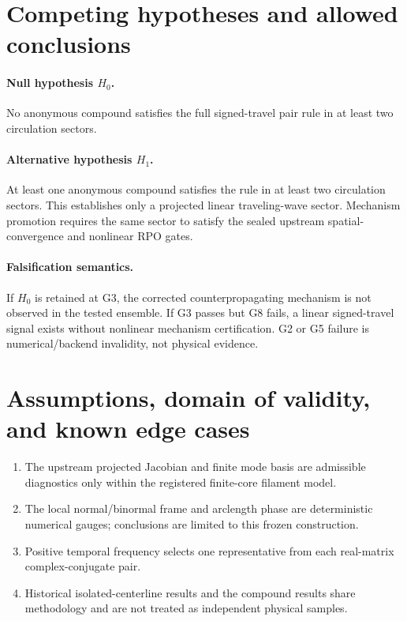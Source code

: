 \documentclass[11pt,a4paper]{article}
\begin{document}
\section{Competing hypotheses and allowed conclusions}
\paragraph{Null hypothesis $H_0$.}
No anonymous compound satisfies the full signed-travel pair rule in at least two circulation sectors.

\paragraph{Alternative hypothesis $H_1$.}
At least one anonymous compound satisfies the rule in at least two circulation sectors. This establishes only a projected linear traveling-wave sector. Mechanism promotion requires the same sector to satisfy the sealed upstream spatial-convergence and nonlinear RPO gates.

\paragraph{Falsification semantics.}
If $H_0$ is retained at G3, the corrected counterpropagating mechanism is not observed in the tested ensemble. If G3 passes but G8 fails, a linear signed-travel signal exists without nonlinear mechanism certification. G2 or G5 failure is numerical/backend invalidity, not physical evidence.

\section{Assumptions, domain of validity, and known edge cases}
\begin{enumerate}[label=A\arabic*.]
\item The upstream projected Jacobian and finite mode basis are admissible diagnostics only within the registered finite-core filament model.
\item The local normal/binormal frame and arclength phase are deterministic numerical gauges; conclusions are limited to this frozen construction.
\item Positive temporal frequency selects one representative from each real-matrix complex-conjugate pair.
\item Historical isolated-centerline results and the compound results share methodology and are not treated as independent physical samples.
\end{enumerate}
\end{document}
